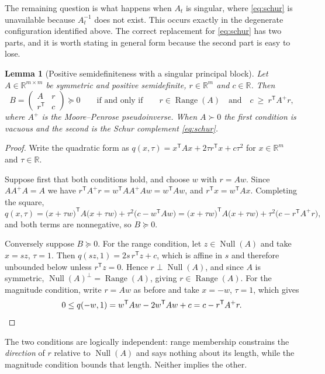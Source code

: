 \documentclass[11pt]{article}
\newtheorem{lemma}[lemma]{Lemma}
\theoremstyle{definition}
\newcommand{\R}{\mathbb{R}}
\newcommand{\Range}{\operatorname{Range}}
\newcommand{\Null}{\operatorname{Null}}
\begin{document}
The remaining question is what happens when $A_t$ is singular, where \eqref{eq:schur} is unavailable because $A_t^{-1}$ does not exist. This occurs exactly in the degenerate configuration identified above. The correct replacement for \eqref{eq:schur} has two parts, and it is worth stating in general form because the second part is easy to lose.

\begin{lemma}[Positive semidefiniteness with a singular principal block]\label{lem:singular_schur}
Let $A\in\R^{m\times m}$ be symmetric and positive semidefinite, $r\in\R^m$ and $c\in\R$. Then
\[
B=\begin{pmatrix}A&r\\r^{\mathsf T}&c\end{pmatrix}\succeq0
\qquad\text{if and only if}\qquad
r\in\Range(A)
\quad\text{and}\quad
c\ \ge\ r^{\mathsf T}A^{+}r,
\]
where $A^{+}$ is the Moore--Penrose pseudoinverse. When $A\succ0$ the first condition is vacuous and the second is the Schur complement \eqref{eq:schur}.
\end{lemma}

\begin{proof}
Write the quadratic form as $q(x,\tau)=x^{\mathsf T}Ax+2\tau r^{\mathsf T}x+c\tau^2$ for $x\in\R^m$ and $\tau\in\R$.

Suppose first that both conditions hold, and choose $w$ with $r=Aw$. Since $AA^{+}A=A$ we have $r^{\mathsf T}A^{+}r=w^{\mathsf T}AA^{+}Aw=w^{\mathsf T}Aw$, and $r^{\mathsf T}x=w^{\mathsf T}Ax$. Completing the square,
\[
q(x,\tau)
=\bigl(x+\tau w\bigr)^{\mathsf T}A\bigl(x+\tau w\bigr)+\tau^2\bigl(c-w^{\mathsf T}Aw\bigr)
=\bigl(x+\tau w\bigr)^{\mathsf T}A\bigl(x+\tau w\bigr)+\tau^2\bigl(c-r^{\mathsf T}A^{+}r\bigr),
\]
and both terms are nonnegative, so $B\succeq0$.

Conversely suppose $B\succeq0$. For the range condition, let $z\in\Null(A)$ and take $x=sz$, $\tau=1$. Then $q(sz,1)=2s\,r^{\mathsf T}z+c$, which is affine in $s$ and therefore unbounded below unless $r^{\mathsf T}z=0$. Hence $r\perp\Null(A)$, and since $A$ is symmetric, $\Null(A)^{\perp}=\Range(A)$, giving $r\in\Range(A)$. For the magnitude condition, write $r=Aw$ as before and take $x=-w$, $\tau=1$, which gives
\[
0\le q(-w,1)=w^{\mathsf T}Aw-2w^{\mathsf T}Aw+c=c-r^{\mathsf T}A^{+}r . \qedhere
\]
\end{proof}

The two conditions are logically independent: range membership constrains the \emph{direction} of $r$ relative to $\Null(A)$ and says nothing about its length, while the magnitude condition bounds that length. Neither implies the other.
\end{document}
